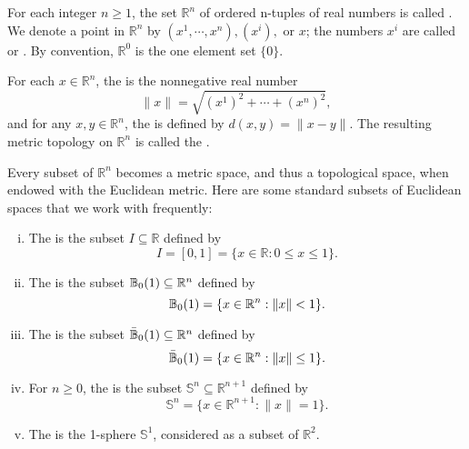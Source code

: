 \documentclass[11pt,a4paper]{article}
\begin{document}
\begin{example}
    For each integer $n\ge 1$, the set $\mathbb{R}^n$ of ordered n-tuples of real numbers is called . We denote a point in $\mathbb{R}^n$ by $(x^1,\cdots, x^n),(x^i),$ or $x$; the numbers $x^i$ are called  or . By convention, $\mathbb{R}^0$ is the one element set $\{0\}$.

    For each $x\in \mathbb{R}^n$, the  is the nonnegative real number 
    \begin{equation*}
        \|x\| = \sqrt{(x^1)^2+\cdots+(x^n)^2},
    \end{equation*}
    and for any $x,y\in \mathbb{R}^n$, the  is defined by $d(x,y)=\|x-y\|$. The resulting metric topology on $\mathbb{R}^n$ is called the .
\end{example}

\begin{example}
    Every subset of $\mathbb{R}^n$ becomes a metric space, and thus a topological space, when endowed with the Euclidean metric. 
    Here are some standard subsets of Euclidean spaces that we work with frequently:
    \begin{enumerate}[(i)]
        \item The  is the subset $I\subseteq \mathbb{R}$ defined by 
        \begin{equation*}
            I = [0,1] = \{x\in\mathbb{R}:0\le x\le 1\}.
        \end{equation*}
        \item The  is the subset $\mathbb{B}_0(1)\subseteq \mathbb{R}^n$ defined by
        \begin{equation*}
            \mathbb{B}_0(1) = \{x\in\mathbb{R}^n:\|x\|<1\}.
        \end{equation*}
        \item The  is the subset $\bar{\mathbb{B}}_0(1)\subseteq \mathbb{R}^n$ defined by
        \begin{equation*}
            \bar{\mathbb{B}}_0(1) = \{x\in\mathbb{R}^n:\|x\|\le 1\}.
        \end{equation*}
        \item For $n\ge 0$, the  is the subset $\mathbb{S}^n\subseteq \mathbb{R}^{n+1}$ defined by
        \begin{equation*}
            \mathbb{S}^n = \{x\in\mathbb{R}^{n+1}:\|x\|= 1\}.
        \end{equation*}
        \item The  is the 1-sphere $\mathbb{S}^1$, considered as a subset of $\mathbb{R}^2$.
    \end{enumerate}
\end{example}
\end{document}
